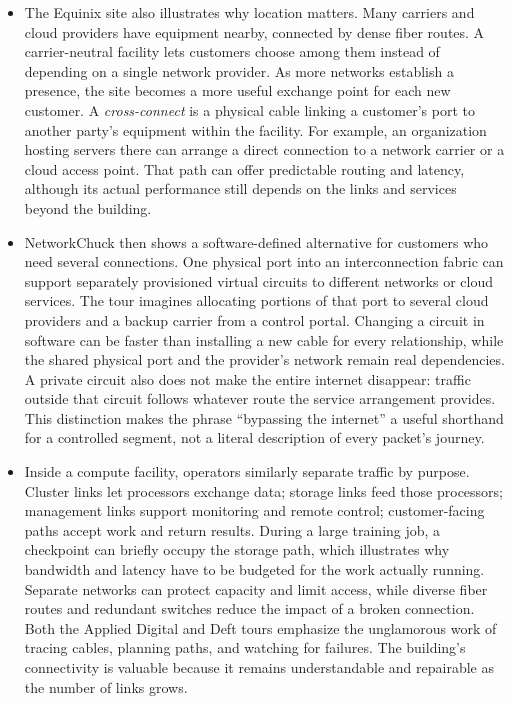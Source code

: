 \documentclass[10pt]{article}
\begin{document}
\begin{itemize}[leftmargin=1.25em, itemsep=0.3em, parsep=0pt, topsep=0pt]
    \item The Equinix site also illustrates why location matters. Many carriers and cloud providers have equipment nearby, connected by dense fiber routes. A carrier-neutral facility lets customers choose among them instead of depending on a single network provider. As more networks establish a presence, the site becomes a more useful exchange point for each new customer. A \textit{cross-connect} is a physical cable linking a customer's port to another party's equipment within the facility. For example, an organization hosting servers there can arrange a direct connection to a network carrier or a cloud access point. That path can offer predictable routing and latency, although its actual performance still depends on the links and services beyond the building.

    \item NetworkChuck then shows a software-defined alternative for customers who need several connections. One physical port into an interconnection fabric can support separately provisioned virtual circuits to different networks or cloud services. The tour imagines allocating portions of that port to several cloud providers and a backup carrier from a control portal. Changing a circuit in software can be faster than installing a new cable for every relationship, while the shared physical port and the provider's network remain real dependencies. A private circuit also does not make the entire internet disappear: traffic outside that circuit follows whatever route the service arrangement provides. This distinction makes the phrase ``bypassing the internet'' a useful shorthand for a controlled segment, not a literal description of every packet's journey.

    \item Inside a compute facility, operators similarly separate traffic by purpose. Cluster links let processors exchange data; storage links feed those processors; management links support monitoring and remote control; customer-facing paths accept work and return results. During a large training job, a checkpoint can briefly occupy the storage path, which illustrates why bandwidth and latency have to be budgeted for the work actually running. Separate networks can protect capacity and limit access, while diverse fiber routes and redundant switches reduce the impact of a broken connection. Both the Applied Digital and Deft tours emphasize the unglamorous work of tracing cables, planning paths, and watching for failures. The building's connectivity is valuable because it remains understandable and repairable as the number of links grows.
\end{itemize}
\end{document}
